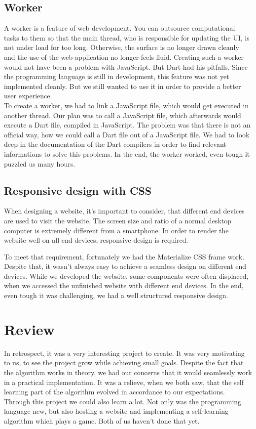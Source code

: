 \subsection{Worker}
A worker is a feature of web development. You can outsource computational tasks to them so that the main thread, who is responsible for updating the UI, is not under load for too long. Otherwise, the surface is no longer drawn cleanly and the use of the web application no longer feels fluid. Creating such a worker would not have been a problem with JavaScript. But Dart had his pitfalls. Since the programming language is still in development, this feature was not yet implemented cleanly. But we still wanted to use it in order to provide a better user experience.\\
To create a worker, we had to link a JavaScript file, which would get executed in another thread. Our plan was to call a JavaScript file, which afterwards would execute a Dart file, compiled in JavaScript. The problem was that there is not an official way, how we could call a Dart file out of a JavaScript file. We had to look deep in the documentation of the Dart compilers in order to find relevant informations to solve this problems. In the end, the worker worked, even tough it puzzled us many hours.

\subsection{Responsive design with CSS}
When designing a website, it's important to consider, that different end devices are used to visit the website. The screen size and ratio of a normal desktop computer is extremely different from a smartphone. In order to render the website well on all end devices, \ac{responsive} design is required. 

To meet that requirement, fortunately we had the Materialize CSS frame work. Despite that, it wasn't always easy to achieve a seamless design on different end devices. While we developed the website, some components were often displaced, when we accessed the unfinished website with different end devices. 
In the end, even tough it was challenging, we had a well structured responsive design.

\section{Review}
In retrospect, it was a very interesting project to create. It was very motivating to us, to see the project grow while achieving small goals. Despite the fact that the algorithm works in theory, we had our concerns that it would seamlessly work in a practical implementation. It was a relieve, when we both saw, that the self learning part of the algorithm evolved in accordance to our expectations. Through this project we could also learn a lot. Not only was the programming language new, but also hosting a website and implementing a self-learning algorithm which plays a game. Both of us haven't done that yet.

